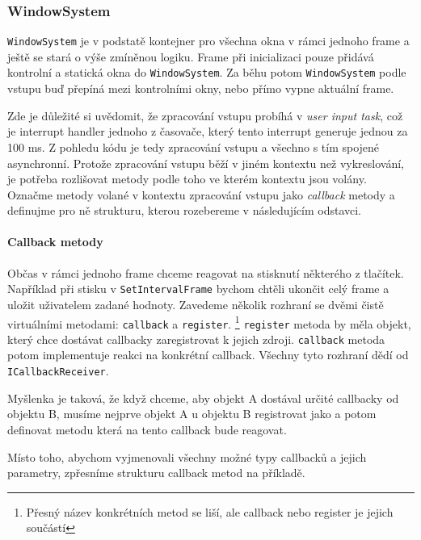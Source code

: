 \subsubsection{WindowSystem}
\texttt{WindowSystem} je v podstatě kontejner pro všechna okna v rámci jednoho frame a ještě se stará
o výše zmíněnou logiku.
Frame při inicializaci pouze přidává kontrolní a statická okna do \texttt{WindowSystem}.
Za běhu potom \texttt{WindowSystem} podle vstupu buď přepíná mezi kontrolními okny, nebo přímo vypne
aktuální frame.

Zde je důležité si uvědomit, že zpracování vstupu probíhá v \emph{user input task}, což je interrupt
handler jednoho z časovače, který tento interrupt generuje jednou za 100 ms.
Z pohledu kódu je tedy zpracování vstupu a všechno s tím spojené asynchronní.
Protože zpracování vstupu běží v jiném kontextu než vykreslování, je potřeba rozlišovat metody podle
toho ve kterém kontextu jsou volány.
Označme metody volané v kontextu zpracování vstupu jako \emph{callback} metody a definujme pro
ně strukturu, kterou rozebereme v následujícím odstavci.

\paragraph{Callback metody}
Občas v rámci jednoho frame chceme reagovat na stisknutí některého z tlačítek.
Například při stisku  v \texttt{SetIntervalFrame} bychom chtěli ukončit celý frame a uložit
uživatelem zadané hodnoty.
Zavedeme několik rozhraní se dvěmi čistě virtuálními metodami: \texttt{callback} a \texttt{register}.
\footnote{Přesný název konkrétních metod se liší, ale callback nebo register je jejich součástí}
\texttt{register} metoda by měla objekt, který chce dostávat callbacky zaregistrovat k jejich zdroji.
\texttt{callback} metoda potom implementuje reakci na konkrétní callback.
Všechny tyto rozhraní dědí od \texttt{ICallbackReceiver}.

Myšlenka je taková, že když chceme, aby objekt A dostával určité callbacky od objektu B,
musíme nejprve objekt A u objektu B registrovat jako  a potom definovat
metodu která na tento callback bude reagovat.

Místo toho, abychom vyjmenovali všechny možné typy callbacků a jejich parametry, zpřesníme
strukturu callback metod na příkladě.

